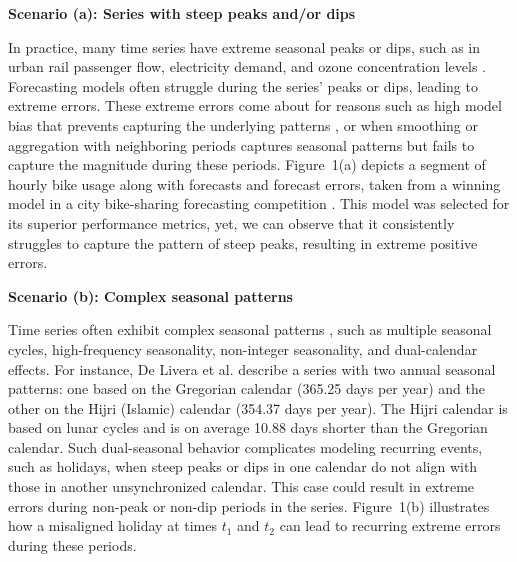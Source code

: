 \documentclass[preprint,12pt]{elsarticle}
\newenvironment{scenario}[1]{%
  \par\vspace{1ex}\noindent\textbf{#1}\par\vspace{0.5ex}}{\par}
\begin{document}
\begin{scenario}{Scenario (a): Series with steep peaks and/or dips}
In practice, many time series have extreme seasonal peaks or dips, such as in urban rail passenger flow, electricity demand, and ozone concentration levels  \citep{li2024, amaraouali2023, marvin2022}. Forecasting models often struggle during the series' peaks or dips, leading to extreme errors. These extreme errors come about for reasons such as high model bias that prevents capturing the underlying patterns \citep{lin2023}, or when smoothing or aggregation with neighboring periods captures seasonal patterns but fails to capture the magnitude during these periods. Figure~1(a) depicts a segment of hourly bike usage along with forecasts and forecast errors, taken from a winning model in a city bike-sharing forecasting competition \citep{mohit2020}. This model was selected for its superior performance metrics, yet, we can observe that it consistently struggles to capture the pattern of steep peaks, resulting in extreme positive errors.
\end{scenario}

\begin{scenario}{Scenario (b): Complex seasonal patterns}

Time series often exhibit complex seasonal patterns \citep{zhao2024}, such as multiple seasonal cycles, high-frequency seasonality, non-integer seasonality, and dual-calendar effects. For instance, De Livera et al. \cite{delivera2011} describe a series with two annual seasonal patterns: one based on the Gregorian calendar (365.25 days per year) and the other on the Hijri (Islamic) calendar (354.37 days per year). The Hijri calendar is based on lunar cycles and is on average 10.88 days shorter than the Gregorian calendar. Such dual-seasonal behavior complicates modeling recurring events, such as holidays, when steep peaks or dips in one calendar do not align with those in another unsynchronized calendar. This case could result in extreme errors during non-peak or non-dip periods in the series. %
Figure~1(b) illustrates how a misaligned holiday at times $t_1$ and $t_2$ can lead to recurring extreme errors during these periods.
\end{scenario}
\end{document}
